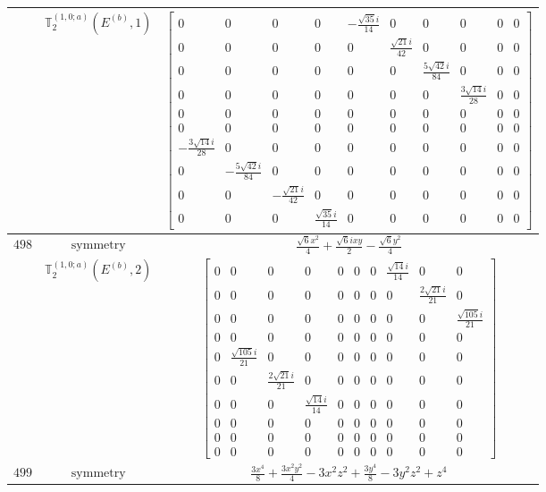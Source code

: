 \documentclass[fleqn,8pt,landscape]{jsarticle}
\begin{document}
\begin{longtable}{ccc}
$  $ & $ \mathbb{T}_{2}^{(1,0;a)}(E^{(b)},1) $ & $ \begin{bmatrix} 0 & 0 & 0 & 0 & - \frac{\sqrt{35} i}{14} & 0 & 0 & 0 & 0 & 0 \\ 0 & 0 & 0 & 0 & 0 & \frac{\sqrt{21} i}{42} & 0 & 0 & 0 & 0 \\ 0 & 0 & 0 & 0 & 0 & 0 & \frac{5 \sqrt{42} i}{84} & 0 & 0 & 0 \\ 0 & 0 & 0 & 0 & 0 & 0 & 0 & \frac{3 \sqrt{14} i}{28} & 0 & 0 \\ 0 & 0 & 0 & 0 & 0 & 0 & 0 & 0 & 0 & 0 \\ 0 & 0 & 0 & 0 & 0 & 0 & 0 & 0 & 0 & 0 \\ - \frac{3 \sqrt{14} i}{28} & 0 & 0 & 0 & 0 & 0 & 0 & 0 & 0 & 0 \\ 0 & - \frac{5 \sqrt{42} i}{84} & 0 & 0 & 0 & 0 & 0 & 0 & 0 & 0 \\ 0 & 0 & - \frac{\sqrt{21} i}{42} & 0 & 0 & 0 & 0 & 0 & 0 & 0 \\ 0 & 0 & 0 & \frac{\sqrt{35} i}{14} & 0 & 0 & 0 & 0 & 0 & 0 \end{bmatrix} $ \\ \hline
$ 498 $ & $ \text{symmetry} $ & $ \frac{\sqrt{6} x^{2}}{4} + \frac{\sqrt{6} i x y}{2} - \frac{\sqrt{6} y^{2}}{4} $ \\
$  $ & $ \mathbb{T}_{2}^{(1,0;a)}(E^{(b)},2) $ & $ \begin{bmatrix} 0 & 0 & 0 & 0 & 0 & 0 & 0 & \frac{\sqrt{14} i}{14} & 0 & 0 \\ 0 & 0 & 0 & 0 & 0 & 0 & 0 & 0 & \frac{2 \sqrt{21} i}{21} & 0 \\ 0 & 0 & 0 & 0 & 0 & 0 & 0 & 0 & 0 & \frac{\sqrt{105} i}{21} \\ 0 & 0 & 0 & 0 & 0 & 0 & 0 & 0 & 0 & 0 \\ 0 & \frac{\sqrt{105} i}{21} & 0 & 0 & 0 & 0 & 0 & 0 & 0 & 0 \\ 0 & 0 & \frac{2 \sqrt{21} i}{21} & 0 & 0 & 0 & 0 & 0 & 0 & 0 \\ 0 & 0 & 0 & \frac{\sqrt{14} i}{14} & 0 & 0 & 0 & 0 & 0 & 0 \\ 0 & 0 & 0 & 0 & 0 & 0 & 0 & 0 & 0 & 0 \\ 0 & 0 & 0 & 0 & 0 & 0 & 0 & 0 & 0 & 0 \\ 0 & 0 & 0 & 0 & 0 & 0 & 0 & 0 & 0 & 0 \end{bmatrix} $ \\ \hline
$ 499 $ & $ \text{symmetry} $ & $ \frac{3 x^{4}}{8} + \frac{3 x^{2} y^{2}}{4} - 3 x^{2} z^{2} + \frac{3 y^{4}}{8} - 3 y^{2} z^{2} + z^{4} $ \\

\end{longtable}
\end{document}
